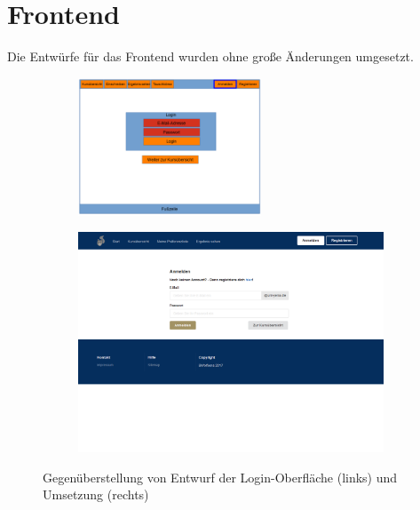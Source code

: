     \section{Frontend}
        Die Entwürfe für das Frontend wurden ohne große Änderungen umgesetzt.
        
        \begin{figure}[h]
            \centering
            \begin{subfigure}{\textwidth}
            	\centering
                \includegraphics[width=0.6\textwidth]{./implementation/images/MockUpsFrontend/frontendLogin.png}
            \end{subfigure}
            \begin{subfigure}{\textwidth}
                \includegraphics[width=1.0\textwidth]{./implementation/images/login.png}
            \end{subfigure}
            \caption{Gegenüberstellung von Entwurf der Login-Oberfläche (links) und Umsetzung (rechts)}
            \label{fig:comparisonLogin}
        \end{figure}
    
